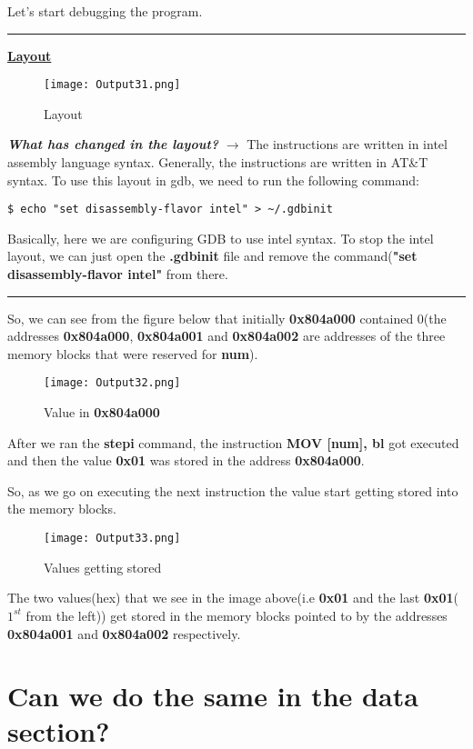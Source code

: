 \documentclass{article}
\begin{document}
\newpage
Let's start debugging the program.

\rule{\linewidth}{1pt}
\underline{\textbf{Layout}}
\begin{figure}[h]
\centering
\texttt{[image: Output31.png]}
\caption{Layout}
\label{fig:fig1}
\end{figure}

\textit{\textbf{What has changed in the layout?}} $\rightarrow$ The instructions are written in intel assembly language syntax. Generally, the instructions are written in AT\&T syntax. To use this layout in gdb, we need to run the following command:
\begin{Verbatim}[frame=single]
$ echo "set disassembly-flavor intel" > ~/.gdbinit
\end{Verbatim}
Basically, here we are configuring GDB to use intel syntax. To stop the intel layout, we can just open the \textbf{.gdbinit} file and remove the command(\textbf{"set disassembly-flavor intel"} from there.

\rule{\linewidth}{1pt}
\newpage
So, we can see from the figure below that initially \textbf{0x804a000} contained $0$(the addresses \textbf{0x804a000}, \textbf{0x804a001} and \textbf{0x804a002} are addresses of the three memory blocks that were reserved for \textbf{num}).
\begin{figure}[h]
\centering
\texttt{[image: Output32.png]}
\caption{Value in \textbf{0x804a000}}
\label{fig:fig2}
\end{figure}

After we ran the \textbf{stepi} command, the instruction \textbf{MOV [num], bl} got executed and then the value \textbf{0x01} was stored in the address \textbf{0x804a000}.

\vspace{10pt}
So, as we go on executing the next instruction the value start getting stored into the memory blocks.
\begin{figure}[h]
\centering
\texttt{[image: Output33.png]}
\caption{Values getting stored}
\label{fig:fig3}
\end{figure}

The two values(hex) that we see in the image above(i.e \textbf{0x01} and the last \textbf{0x01}($1^{st}$ from the left)) get stored in the memory blocks pointed to by the addresses \textbf{0x804a001} and \textbf{0x804a002} respectively.

\newpage
\section{Can we do the same in the data section?}\label{sec:datSec}
\end{document}
